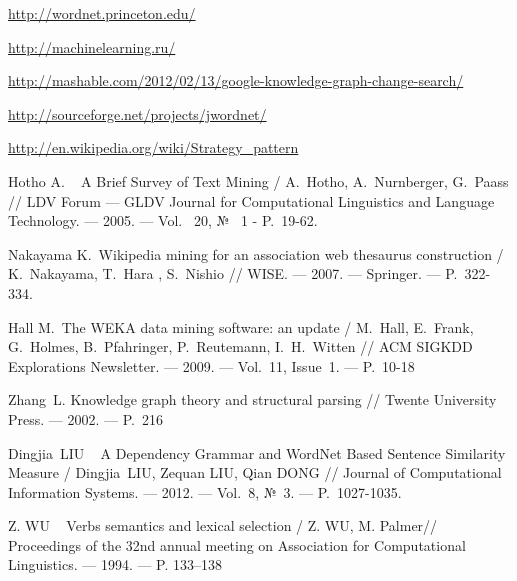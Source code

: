 \url{http://wordnet.princeton.edu/}

\url{http://machinelearning.ru/}

\url{http://mashable.com/2012/02/13/google-knowledge-graph-change-search/}

\url{http://sourceforge.net/projects/jwordnet/}

\url{http://en.wikipedia.org/wiki/Strategy_pattern}

Hotho A. ~ 
A Brief Survey of Text Mining /
A.~Hotho, A.~Nurnberger, G.~Paass //  
LDV Forum --- GLDV Journal for Computational Linguistics
 and Language Technology. --- 2005. --- Vol.~ 20, № ~1 - P.~19-62.


Nakayama K.~Wikipedia mining for an association web thesaurus construction /
K.~Nakayama, T.~Hara , S.~Nishio // WISE. --- 2007. --- Springer. --- P.~322-334.
 
Hall M.~The WEKA data mining software: an update /
 M.~Hall, E.~Frank, G.~Holmes, B.~Pfahringer, P.~Reutemann, I.~H.~Witten // 
 ACM SIGKDD Explorations Newsletter. --- 2009. --- Vol.~11, Issue~1. --- P.~10-18 
 
Zhang~L.  Knowledge graph theory and structural parsing //
 Twente University Press. --- 2002. ---  P.~216

 
Dingjia~LIU ~
A Dependency Grammar and WordNet Based Sentence Similarity Measure /
Dingjia~LIU, Zequan LIU, Qian DONG //
Journal of Computational Information Systems. --- 2012. ---
Vol.~8, №~3. --- P.~1027-1035.
 
Z. WU ~
Verbs semantics and lexical selection /
 Z. WU, M. Palmer//
 Proceedings of the 32nd annual meeting on Association
for Computational Linguistics. --- 1994. --- P. 133--138
